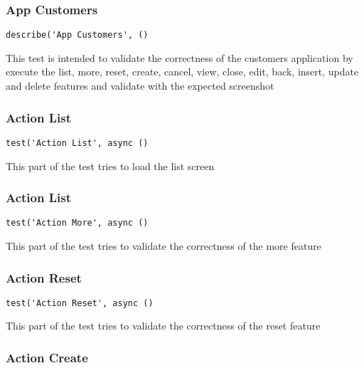\documentclass[a4paper]{article}
\begin{document}
\hypertarget{toc552}{}
\subsubsection{App Customers}

\begin{lstlisting}
describe('App Customers', ()
\end{lstlisting}

This test is intended to validate the correctness of the customers application
by execute the list, more, reset, create, cancel, view, close, edit, back,
insert, update and delete features and validate with the expected screenshot

\hypertarget{toc553}{}
\subsubsection{Action List}

\begin{lstlisting}
test('Action List', async ()
\end{lstlisting}

This part of the test tries to load the list screen

\hypertarget{toc554}{}
\subsubsection{Action List}

\begin{lstlisting}
test('Action More', async ()
\end{lstlisting}

This part of the test tries to validate the correctness of the more feature

\hypertarget{toc555}{}
\subsubsection{Action Reset}

\begin{lstlisting}
test('Action Reset', async ()
\end{lstlisting}

This part of the test tries to validate the correctness of the reset feature

\hypertarget{toc556}{}
\subsubsection{Action Create}
\end{document}
